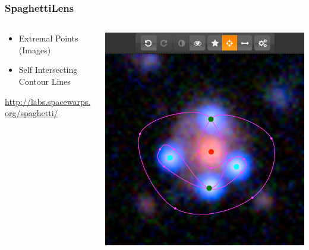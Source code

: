 \documentclass{beamer}
\begin{document}

 \begin{frame}
   \frametitle{SpaghettiLens}
 
   \begin{columns}[c]
   \begin{column}{0.5\textwidth}
     \begin{itemize}
       \item Extremal Points (Images)
       \item Self Intersecting Contour Lines
     \end{itemize}
     
     \footnotesize{\url{http://labs.spacewarps.org/spaghetti/}}
 
   \end{column}\begin{column}{0.5\textwidth}
     \includegraphics[width=\textwidth]{imgs/screenshot}
   \end{column}
   \end{columns}
 \end{frame}
\end{document}
